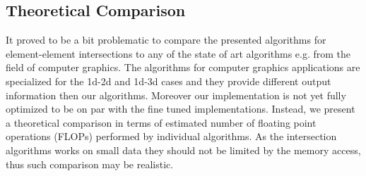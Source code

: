 

\subsection{Theoretical Comparison}
It proved to be a bit problematic to compare the presented algorithms for element-element intersections to any of the state of art
algorithms e.g. from the field of computer graphics. The algorithms for computer graphics applications are specialized for
the 1d-2d and 1d-3d cases and they provide different output information then our algorithms. Moreover our implementation 
is not yet fully optimized to be on par with the fine tuned implementations. Instead, we present a theoretical comparison 
in terms of estimated number of floating point operations (FLOPs) performed by individual algorithms. As the intersection 
algorithms works on small data they should not be limited by the memory access, thus such comparison may be realistic. 

